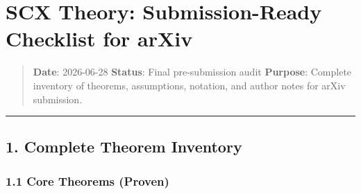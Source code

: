\documentclass[
  12pt,
]{ctexart}
\author{SCX}
\date{2026}
\begin{document}
\section{SCX Theory: Submission-Ready Checklist for
arXiv}\label{scx-theory-submission-ready-checklist-for-arxiv}

\begin{quote}
\textbf{Date}: 2026-06-28 \textbar{} \textbf{Status}: Final
pre-submission audit \textbf{Purpose}: Complete inventory of theorems,
assumptions, notation, and author notes for arXiv submission.
\end{quote}

\begin{center}\rule{0.5\linewidth}{0.5pt}\end{center}

\subsection{1. Complete Theorem
Inventory}\label{complete-theorem-inventory}

\subsubsection{1.1 Core Theorems (Proven)}\label{core-theorems-proven}
\end{document}

